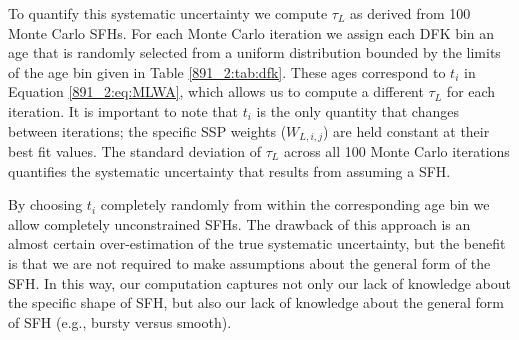 
To quantify this systematic uncertainty we compute $\tau_L$ as derived
from 100 Monte Carlo SFHs. For each Monte Carlo iteration we assign
each DFK bin an age that is randomly selected from a uniform
distribution bounded by the limits of the age bin given in Table
\ref{891_2:tab:dfk}. These ages correspond to $t_i$ in Equation
\ref{891_2:eq:MLWA}, which allows us to compute a different $\tau_L$ for
each iteration. It is important to note that $t_i$ is the only
quantity that changes between iterations; the specific SSP weights
($W_{L,i,j}$) are held constant at their best fit values. The standard
deviation of $\tau_L$ across all 100 Monte Carlo iterations quantifies
the systematic uncertainty that results from assuming a SFH.

By choosing $t_i$ completely randomly from within the corresponding
age bin we allow completely unconstrained SFHs. The drawback of this
approach is an almost certain over-estimation of the true systematic
uncertainty, but the benefit is that we are not required to make
assumptions about the general form of the SFH. In this way, our
computation captures not only our lack of knowledge about the specific
shape of SFH, but also our lack of knowledge about the general form of
SFH (e.g., bursty versus smooth).

